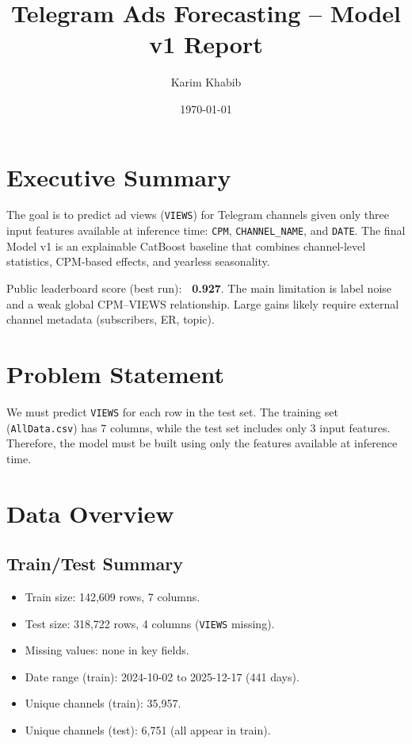 \documentclass[11pt]{article}
\title{Telegram Ads Forecasting -- Model v1 Report}
\author{Karim Khabib}
\date{\today}
\begin{document}
\maketitle
\tableofcontents

\section{Executive Summary}
The goal is to predict ad views (\texttt{VIEWS}) for Telegram channels given only
three input features available at inference time: \texttt{CPM}, \texttt{CHANNEL\_NAME}, and \texttt{DATE}.
The final Model v1 is an explainable CatBoost baseline that combines
channel-level statistics, CPM-based effects, and yearless seasonality.

Public leaderboard score (best run): \textbf{~0.927}.
The main limitation is label noise and a weak global CPM--VIEWS relationship.
Large gains likely require external channel metadata (subscribers, ER, topic).

\section{Problem Statement}
We must predict \texttt{VIEWS} for each row in the test set.
The training set (\texttt{AllData.csv}) has 7 columns,
while the test set includes only 3 input features.
Therefore, the model must be built using only the features
available at inference time.

\section{Data Overview}
\subsection{Train/Test Summary}
\begin{itemize}
    \item Train size: 142,609 rows, 7 columns.
    \item Test size: 318,722 rows, 4 columns (\texttt{VIEWS} missing).
    \item Missing values: none in key fields.
    \item Date range (train): 2024-10-02 to 2025-12-17 (441 days).
    \item Unique channels (train): 35,957.
    \item Unique channels (test): 6,751 (all appear in train).
\end{itemize}
\end{document}
